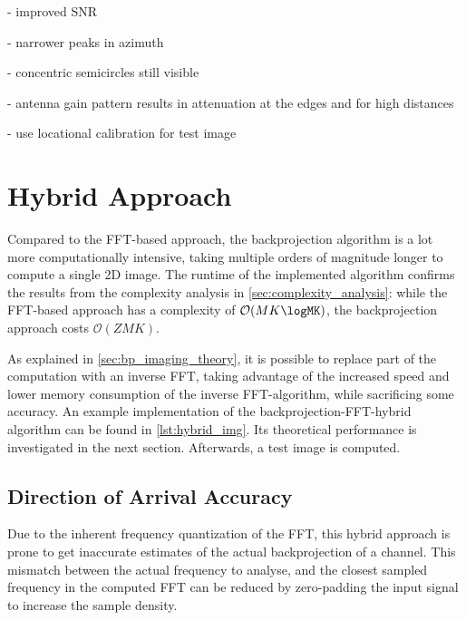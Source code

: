 - improved SNR

- narrower peaks in azimuth

- concentric semicircles still visible

- antenna gain pattern results in attenuation at the edges and for high distances

- use locational calibration for test image

\section{Hybrid Approach}
\label{sec:hybrid_imaging}
Compared to the FFT-based approach, the backprojection algorithm is a lot more computationally intensive,
taking multiple orders of magnitude longer to compute a single 2D image.
The runtime of the implemented algorithm confirms the results from the complexity analysis in \autoref{sec:complexity_analysis}:
while the FFT-based approach has a complexity of $\mathcal O(MK\logMK)$, the backprojection approach costs $\mathcal O(ZMK)$.

As explained in \autoref{sec:bp_imaging_theory},
it is possible to replace part of the computation with an inverse FFT,
taking advantage of the increased speed and lower memory consumption of the inverse FFT-algorithm,
while sacrificing some accuracy.
An example implementation of the backprojection-FFT-hybrid algorithm can be found in \ref{lst:hybrid_img}.
Its theoretical performance is investigated in the next section. Afterwards, a test image is computed.

\subsection{Direction of Arrival Accuracy}

Due to the inherent frequency quantization of the FFT,
this hybrid approach is prone to get inaccurate estimates of the actual backprojection of a channel.
This mismatch between the actual frequency to analyse, and the closest sampled frequency in the computed FFT
can be reduced by zero-padding the input signal to increase the sample density.

